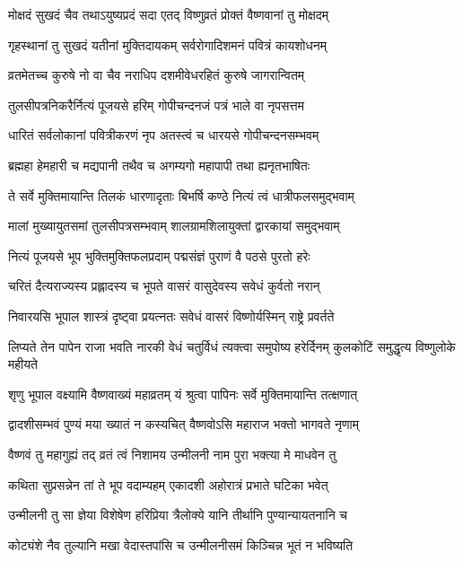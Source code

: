 \twolineshloka
{मोक्षदं सुखदं चैव तथाऽयुष्यप्रदं सदा}
{एतद् विष्णुव्रतं प्रोक्तं वैष्णवानां तु मोक्षदम्}%

\twolineshloka
{गृहस्थानां तु सुखदं यतीनां मुक्तिदायकम्}
{सर्वरोगादिशमनं पवित्रं कायशोधनम्}%

\twolineshloka
{व्रतमेतच्च कुरुषे नो वा चैव नराधिप}
{दशमीवेधरहितं कुरुषे जागरान्वितम्}%

\twolineshloka
{तुलसीपत्रनिकरैर्नित्यं पूजयसे हरिम्}
{गोपीचन्दनजं पत्रं भाले वा नृपसत्तम}%

\twolineshloka
{धारितं सर्वलोकानां पवित्रीकरणं नृप}
{अतस्त्वं च धारयसे गोपीचन्दनसम्भवम्}%

\twolineshloka
{ब्रह्महा हेमहारी च मद्यपानी तथैव च}
{अगम्यगो महापापी तथा ह्यनृतभाषितः}%

\twolineshloka
{ते सर्वे मुक्तिमायान्ति तिलकं धारणादृताः}
{बिभर्षि कण्ठे नित्यं त्वं धात्रीफलसमुद्भवाम्}%

\twolineshloka
{मालां मुख्यायुतसमां तुलसीपत्रसम्भवाम्}
{शालग्रामशिलायुक्तां द्वारकायां समुद्भवाम्}%

\twolineshloka
{नित्यं पूजयसे भूप भुक्तिमुक्तिफलप्रदाम्}
{पद्मसंज्ञं पुराणं वै पठसे पुरतो हरेः}%

\twolineshloka
{चरितं दैत्यराज्यस्य प्रह्लादस्य च भूपते}
{वासरं वासुदेवस्य सवेधं कुर्वतो नरान्}%

\twolineshloka
{निवारयसि भूपाल शास्त्रं दृष्ट्वा प्रयत्नतः}
{सवेधं वासरं विष्णोर्यस्मिन् राष्ट्रे प्रवर्तते}%

\threelineshloka
{लिप्यते तेन पापेन राजा भवति नारकी}
{वेधं चतुर्विधं त्यक्त्वा समुपोष्य हरेर्दिनम्}
{कुलकोटिं समुद्धृत्य विष्णुलोके महीयते}%


\twolineshloka
{शृणु भूपाल वक्ष्यामि वैष्णवाख्यं महाव्रतम्}
{यं श्रुत्वा पापिनः सर्वे मुक्तिमायान्ति तत्क्षणात्}%

\twolineshloka
{द्वादशीसम्भवं पुण्यं मया ख्यातं न कस्यचित्}
{वैष्णवोऽसि महाराज भक्तो भागवते नृणाम्}%

\twolineshloka
{वैष्णवं तु महागुह्यं तद् व्रतं त्वं निशामय}
{उन्मीलनी नाम पुरा भक्त्या मे माधवेन तु}%

\twolineshloka
{कथिता सुप्रसन्नेन तां ते भूप वदाम्यहम्}
{एकादशी अहोरात्रं प्रभाते घटिका भवेत्}%

\twolineshloka
{उन्मीलनी तु सा ज्ञेया विशेषेण हरिप्रिया}
{त्रैलोक्ये यानि तीर्थानि पुण्यान्यायतनानि च}%

\twolineshloka
{कोट्यंशे नैव तुल्यानि मखा वेदास्तपांसि च}
{उन्मीलनीसमं किञ्चिन्न भूतं न भविष्यति}%

